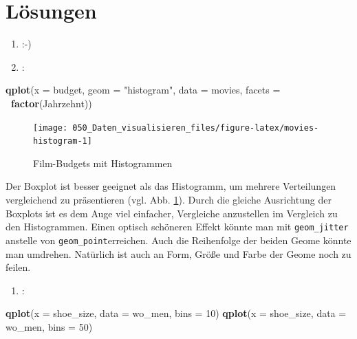 \documentclass[12pt,ngerman,]{book}
\makeatletter
\newenvironment{Shaded}{\begin{snugshade}}{\end{snugshade}}
\newcommand{\KeywordTok}[1]{\textcolor[rgb]{0.13,0.29,0.53}{\textbf{#1}}}
\newcommand{\DataTypeTok}[1]{\textcolor[rgb]{0.13,0.29,0.53}{#1}}
\newcommand{\DecValTok}[1]{\textcolor[rgb]{0.00,0.00,0.81}{#1}}
\newcommand{\StringTok}[1]{\textcolor[rgb]{0.31,0.60,0.02}{#1}}
\newcommand{\OperatorTok}[1]{\textcolor[rgb]{0.81,0.36,0.00}{\textbf{#1}}}
\newcommand{\NormalTok}[1]{#1}
\providecommand{\tightlist}{%
  \setlength{\itemsep}{0pt}\setlength{\parskip}{0pt}}
\newenvironment{kframe}{%
\medskip{}
\setlength{\fboxsep}{.8em}
 \def\at@end@of@kframe{}%
 \ifinner\ifhmode%
  \def\at@end@of@kframe{\end{minipage}}%
  \begin{minipage}{\columnwidth}%
 \fi\fi%
 \def\FrameCommand##1{\hskip\@totalleftmargin \hskip-\fboxsep
 \colorbox{shadecolor}{##1}\hskip-\fboxsep
     \hskip-\linewidth \hskip-\@totalleftmargin \hskip\columnwidth}%
 \MakeFramed {\advance\hsize-\width
   \@totalleftmargin\z@ \linewidth\hsize
   \@setminipage}}%
 {\par\unskip\endMakeFramed%
 \at@end@of@kframe}
\renewenvironment{Shaded}{\begin{kframe}}{\end{kframe}}
\theoremstyle{definition}
\theoremstyle{definition}
\theoremstyle{remark}
\makeatother
\begin{document}
\section{Lösungen}\label{losungen}

\begin{enumerate}
\def\labelenumi{\arabic{enumi}.}
\item
  :-)
\item
  :
\end{enumerate}

\begin{Shaded}
\begin{Highlighting}[]
\KeywordTok{qplot}\NormalTok{(}\DataTypeTok{x =}\NormalTok{ budget, }\DataTypeTok{geom =} \StringTok{"histogram"}\NormalTok{, }\DataTypeTok{data =}\NormalTok{ movies, }\DataTypeTok{facets =} \OperatorTok{~}\KeywordTok{factor}\NormalTok{(Jahrzehnt))}
\end{Highlighting}
\end{Shaded}

\begin{figure}

{\centering \texttt{[image: 050\_Daten\_visualisieren\_files/figure-latex/movies-histogram-1]} 

}

\caption{Film-Budgets mit Histogrammen}\label{fig:movies-histogram}
\end{figure}

Der Boxplot ist besser geeignet als das Histogramm, um mehrere
Verteilungen vergleichend zu präsentieren (vgl. Abb.
\ref{fig:movies-histogram}). Durch die gleiche Ausrichtung der Boxplots
ist es dem Auge viel einfacher, Vergleiche anzustellen im Vergleich zu
den Histogrammen. Einen optisch schöneren Effekt könnte man mit
\texttt{geom\_jitter} anstelle von \texttt{geom\_point}erreichen. Auch
die Reihenfolge der beiden Geome könnte man umdrehen. Natürlich ist auch
an Form, Größe und Farbe der Geome noch zu feilen.

\begin{enumerate}
\def\labelenumi{\arabic{enumi}.}
\setcounter{enumi}{2}
\tightlist
\item
  :
\end{enumerate}

\begin{Shaded}
\begin{Highlighting}[]
\KeywordTok{qplot}\NormalTok{(}\DataTypeTok{x =}\NormalTok{ shoe_size, }\DataTypeTok{data =}\NormalTok{ wo_men, }\DataTypeTok{bins =} \DecValTok{10}\NormalTok{)}
\KeywordTok{qplot}\NormalTok{(}\DataTypeTok{x =}\NormalTok{ shoe_size, }\DataTypeTok{data =}\NormalTok{ wo_men, }\DataTypeTok{bins =} \DecValTok{50}\NormalTok{)}
\end{Highlighting}
\end{Shaded}
\end{document}

